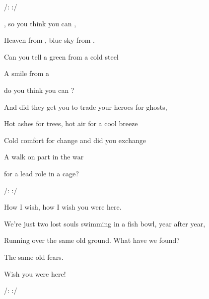 
/:    :/       

\zs
{}, so you think you can ,

Heaven from , blue sky from .

Can you tell a green  from a cold steel 

A smile from a 

do you think you can ?
\ks

\zs
And did they get you to {trade} your heroes for {ghosts},

Hot ashes for {trees}, hot air for a cool {breeze}

Cold comfort for {change}
and did you exchange

A walk on part in the {war}

for a lead role in a cage?
\ks

/:    :/       

\zs
{How} I wish, how I wish you were {here}.

We're just {two} lost souls swimming in a fish bowl, {year} after year,

{Running} over the same old ground. What {have} we found?

The same old {fears}.

Wish you were {here}!
\ks

/:    :/       


\kp



















